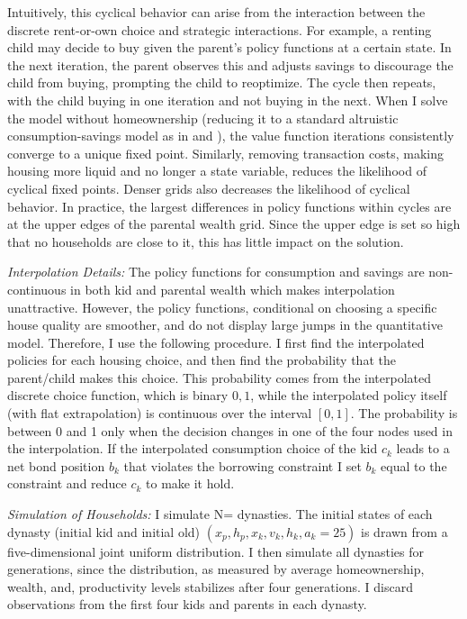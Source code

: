 \documentclass[12pt]{article}
\begin{document}
Intuitively, this cyclical behavior can arise from the interaction between the discrete rent-or-own choice and strategic interactions. For example, a renting child may decide to buy given the parent’s policy functions at a certain state. In the next iteration, the parent observes this and adjusts savings to discourage the child from buying, prompting the child to reoptimize. The cycle then repeats, with the child buying in one iteration and not buying in the next. When I solve the model without homeownership (reducing it to a standard altruistic consumption-savings model as in \cite{Barczyk2020a} and \cite{Chu2020}), the value function iterations consistently converge to a unique fixed point. Similarly, removing transaction costs, making housing more liquid and no longer a state variable, reduces the likelihood of cyclical fixed points. Denser grids also decreases the likelihood of cyclical behavior.  In practice, the largest differences in policy functions within cycles are at the upper edges of the parental wealth grid. Since the upper edge is set so high that no households are close to it, this has little impact on the solution.

\textit{Interpolation Details:} The policy functions for consumption and savings are non-continuous in both kid and parental wealth which makes interpolation unattractive. However, the policy functions, conditional on choosing a specific house quality are smoother, and do not display large jumps in the quantitative model. Therefore, I use the following procedure. I first find the interpolated policies for each housing choice, and then find the probability that the parent/child makes this choice. This probability comes from the interpolated discrete choice function, which is binary ${0,1}$, while the interpolated policy itself (with flat extrapolation) is continuous over the interval $[0,1]$. The probability is between 0 and 1 only when the decision changes in one of the four nodes used in the interpolation. If the interpolated consumption choice of the kid $c_k$ leads to a net bond position $b_k$ that violates the borrowing constraint I set $b_k$ equal to the constraint and reduce $c_k$ to make it hold. 


\textit{Simulation of Households:} 
I simulate N={\parNdyn} dynasties. The initial states of each dynasty (initial kid and initial old) $(x_p,h_p,x_k,v_k,h_k,a_k=25)$ is drawn from a five-dimensional joint uniform distribution. I then simulate all dynasties for {\parNdyn} generations, since the distribution, as measured by average homeownership, wealth, and, productivity levels stabilizes after four generations. I discard observations from the first four kids and parents in each dynasty.
\end{document}
